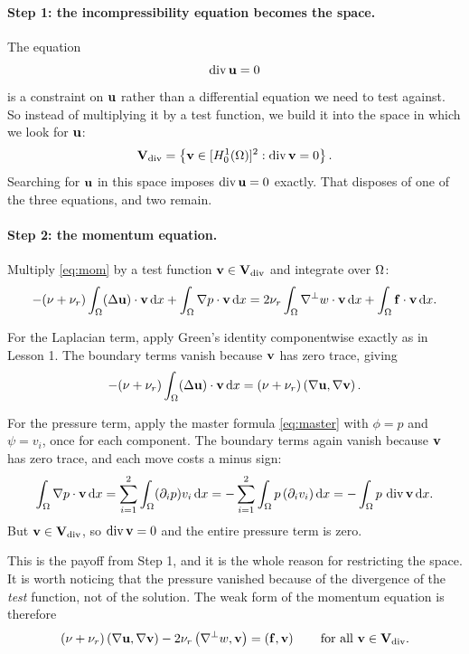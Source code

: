 \documentclass[11pt,a4paper]{article}
\begin{document}
\paragraph{Step 1: the incompressibility equation becomes the space.}
The equation
\[
  \operatorname{div} \mathbf{u} = 0
\]
is a constraint on $\mathbf{u}$ rather than a differential equation we need to test
against. So instead of multiplying it by a test function, we build it into the
space in which we look for $\mathbf{u}$:
\[
  \mathbf{V}_{\mathrm{div}}
  = \left\{ \mathbf{v} \in [H^{1}_{0}(\Omega)]^{2} : \operatorname{div} \mathbf{v} = 0 \right\} .
\]
Searching for $\mathbf{u}$ in this space imposes $\operatorname{div} \mathbf{u} = 0$ exactly. That disposes
of one of the three equations, and two remain.

\paragraph{Step 2: the momentum equation.}
Multiply \eqref{eq:mom} by a test function $\mathbf{v} \in \mathbf{V}_{\mathrm{div}}$
and integrate over $\Omega$:
\[
  -(\nu+\nu_{r}) \int_\Omega (\Delta \mathbf{u})\cdot \mathbf{v} \,\mathrm{d}x
  + \int_\Omega \nabla p \cdot \mathbf{v} \,\mathrm{d}x
  = 2\nu_{r} \int_\Omega \nabla^{\perp} w \cdot \mathbf{v} \,\mathrm{d}x
  + \int_\Omega \mathbf{f}\cdot \mathbf{v} \,\mathrm{d}x .
\]

For the Laplacian term, apply Green's identity componentwise exactly as in
Lesson 1. The boundary terms vanish because $\mathbf{v}$ has zero trace, giving
\[
  -(\nu+\nu_{r}) \int_\Omega (\Delta \mathbf{u})\cdot \mathbf{v} \,\mathrm{d}x
  = (\nu+\nu_{r}) \left( \nabla \mathbf{u} , \nabla \mathbf{v} \right) .
\]

For the pressure term, apply the master formula \eqref{eq:master} with
$\phi = p$ and $\psi = v_{i}$, once for each component. The boundary terms again
vanish because $\mathbf{v}$ has zero trace, and each move costs a minus sign:
\[
  \int_\Omega \nabla p \cdot \mathbf{v} \,\mathrm{d}x
  = \sum_{i=1}^{2} \int_\Omega (\partial_{i} p) v_{i} \,\mathrm{d}x
  = - \sum_{i=1}^{2} \int_\Omega p\, (\partial_{i} v_{i}) \,\mathrm{d}x
  = - \int_\Omega p \,\operatorname{div} \mathbf{v} \,\mathrm{d}x .
\]
But $\mathbf{v} \in \mathbf{V}_{\mathrm{div}}$, so $\operatorname{div} \mathbf{v} = 0$ and the entire
pressure term is zero.

This is the payoff from Step 1, and it is the whole reason for restricting the
space. It is worth noticing that the pressure vanished because of the divergence
of the \emph{test} function, not of the solution. The weak form of the momentum
equation is therefore
\begin{equation}\label{eq:weakmom}
  (\nu+\nu_{r}) \left( \nabla \mathbf{u} , \nabla \mathbf{v} \right)
  - 2\nu_{r} \left( \nabla^{\perp} w , \mathbf{v} \right)
  = \left( \mathbf{f} , \mathbf{v} \right)
  \qquad \text{for all } \mathbf{v} \in \mathbf{V}_{\mathrm{div}} .
\end{equation}
\end{document}
